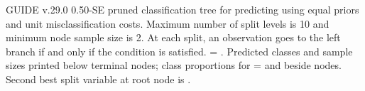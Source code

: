 \documentclass[12pt]{article}
\begin{document}
 \begin{center}
 \end{center}
GUIDE v.29.0  0.50-SE pruned
classification tree for predicting \texttt{} using
equal priors
and unit misclassification costs.
Maximum number of split levels is 10 and minimum node sample size is 2.
At each split, an observation goes to the left branch 
 if and only if the condition is satisfied.
\texttt{} = \texttt{}.
Predicted classes and sample sizes printed below terminal nodes;
 class proportions for \texttt{} =
 \texttt{} and \texttt{} beside nodes.
Second best split variable at root node is \texttt{}.
 
\end{document}
